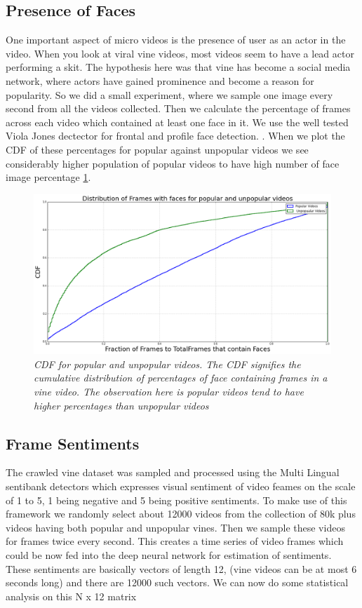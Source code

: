 \subsection{ Presence of Faces }
One important aspect of micro videos is the presence of user as an actor in the video. When you look at viral vine videos, most videos seem to have a lead actor performing a skit. The hypothesis here was that vine has become a social media network, where actors have gained prominence and become a reason for popularity. So we did a small experiment, where we sample one image every second from all the videos collected. Then we calculate the percentage of frames across each video which contained at least one face in it. We use the well tested Viola Jones dectector for frontal and profile face detection. \cite{viola2004robust}. When we plot the CDF of these percentages for popular against unpopular videos we see considerably higher population of popular videos to have high number of face image percentage \ref{fig:Face_CDF}.

\begin{figure}[!htb]
\centering
\includegraphics[width=\columnwidth]{plots/FaceCDF}
\caption{\textsl{ CDF for popular and unpopular videos. The CDF signifies the cumulative distribution of percentages of face containing frames in a vine video. The observation here is popular videos tend to have higher percentages than unpopular videos}}
\label{fig:Face_CDF}
\end{figure}

\subsection{Frame Sentiments}

The crawled vine dataset was sampled and processed using the Multi Lingual sentibank detectors \cite{jou2015visual} which expresses visual sentiment of video feames on the scale of 1 to 5, 1 being negative and 5 being positive sentiments. To make use of this framework we randomly select about 12000 videos from the collection of 80k plus videos having both popular and unpopular vines. Then we sample these videos for frames twice every second. This creates a time series of video frames which could be now fed into the deep neural network for estimation of sentiments. These sentiments are basically vectors of length 12, (vine videos can be at most 6 seconds long) and there are 12000 such vectors. We can now do some statistical analysis on this N x 12 matrix


